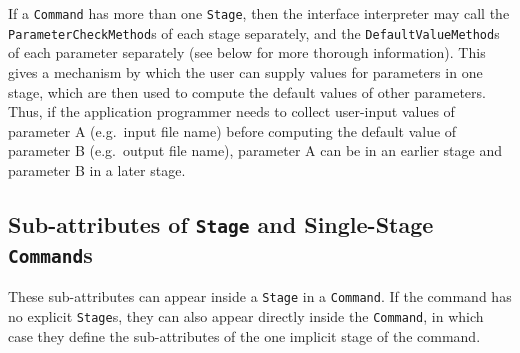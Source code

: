 \documentclass[11pt]{article}
\begin{document}
If a {\tt Command} has more than one {\tt Stage}, then the interface
interpreter may call the {\tt ParameterCheckMethod}s of each stage
separately, and the {\tt DefaultValueMethod}s of each parameter
separately (see below for more thorough information).
This gives a mechanism by which the user can supply values
for parameters in one stage, which are then used to compute the default
values of other parameters.  Thus, if the application programmer needs to
collect user-input values of parameter A (e.g.\ input file name) before
computing the default value of parameter B (e.g.\ output file name),
parameter A can be in an earlier stage and parameter B in a later
stage.


\subsection{Sub-attributes of {\tt Stage} and Single-Stage {\tt Command}s}
\label{sub-attr-stage-sec}

These sub-attributes can appear inside a {\tt Stage} in a {\tt Command}.
If the command has no explicit {\tt Stage}s, they can also appear
directly inside the {\tt Command}, in which case they define the
sub-attributes of the one implicit stage of the command.
\end{document}
